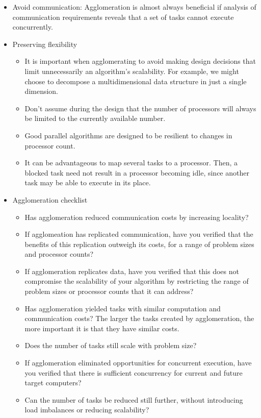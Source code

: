 \documentclass[paper=a4, fontsize=11pt]{scrartcl} %
\numberwithin{equation}{section} %
\numberwithin{figure}{section} %
\numberwithin{table}{section} %
\begin{document}
\begin{itemize}
\begin{itemize}
\begin{itemize}
      \item Avoid communication: Agglomeration is almost always beneficial if analysis of communication requirements reveals that a set of tasks cannot execute concurrently.
      \item Preserving flexibility
      \begin{itemize}
        \item It is important when agglomerating to avoid making design decisions that limit unnecessarily an algorithm's scalability. For example, we might choose to decompose a multidimensional data structure in just a single dimension.
        \item Don't assume during the design that the number of processors will always be limited to the currently available number.
        \item Good parallel algorithms are designed to be resilient to changes in processor count.
        \item It can be advantageous to map several tasks to a processor. Then, a blocked task need not result in a processor becoming idle, since another task may be able to execute in its place.
      \end{itemize}
      \item Agglomeration checklist
      \begin{itemize}
        \item Has agglomeration reduced communication costs by increasing locality?
        \item If agglomeation has replicated communication, have you verified that the benefits of this replication outweigh its costs, for a range of problem sizes and processor counts?
        \item If agglomeration replicates data, have you verified that this does not compromise the scalability of your algorithm by restricting the range of problem sizes or processor counts that it can address?
        \item Has agglomeration yielded tasks with similar computation and communication costs? The larger the tasks created by agglomeration, the more important it is that they have similar costs.
        \item Does the number of tasks still scale with problem size?
        \item If agglomeration eliminated opportunities for concurrent execution, have you verified that there is sufficient concurrency for current and future target computers?
        \item Can the number of tasks be reduced still further, without introducing load imbalances or reducing scalability?

\end{itemize}
\end{itemize}
\end{itemize}
\end{itemize}
\end{document}
